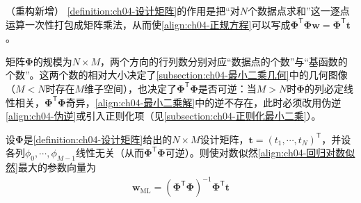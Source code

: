 \documentclass[../../main.tex]{subfiles}
\begin{document}
\begin{remark}（重构新增）
\cref{definition:ch04-设计矩阵}的作用是把“对$N$个数据点求和”这一逐点运算一次性打包成矩阵乘法，从而使\eqref{align:ch04-正规方程}可以写成$\boldsymbol{\Phi}^{\mathsf{T}}\boldsymbol{\Phi}\boldsymbol{w}=\boldsymbol{\Phi}^{\mathsf{T}}\boldsymbol{t}$。

矩阵$\boldsymbol{\Phi}$的规模为$N\times M$，两个方向的行列数分别对应“数据点的个数”与“基函数的个数”。这两个数的相对大小决定了\cref{subsection:ch04-最小二乘几何}中的几何图像（$M<N$时存在$M$维子空间），也决定了$\boldsymbol{\Phi}^{\mathsf{T}}\boldsymbol{\Phi}$是否可逆：当$M>N$时$\boldsymbol{\Phi}$的列必定线性相关，$\boldsymbol{\Phi}^{\mathsf{T}}\boldsymbol{\Phi}$奇异，\eqref{align:ch04-最小二乘解}中的逆不存在，此时必须改用伪逆\eqref{align:ch04-伪逆}或引入正则化项（见\cref{subsection:ch04-正则化最小二乘}）。
\end{remark}

\begin{proposition}[最大似然解]\label{proposition:ch04-最大似然解}
设$\boldsymbol{\Phi}$是\cref{definition:ch04-设计矩阵}给出的$N\times M$设计矩阵，$\boldsymbol{t}=(t_1,\cdots,t_N)^{\mathsf{T}}$，并设各列$\phi_0,\cdots,\phi_{M-1}$线性无关（从而$\boldsymbol{\Phi}^{\mathsf{T}}\boldsymbol{\Phi}$可逆）。则使对数似然\eqref{align:ch04-回归对数似然}最大的参数向量为
\begin{align}
  \boldsymbol{w}_{\mathrm{ML}}=(\boldsymbol{\Phi}^{\mathsf{T}}\boldsymbol{\Phi})^{-1}\boldsymbol{\Phi}^{\mathsf{T}}\boldsymbol{t}
  \label{align:ch04-最小二乘解}
\end{align}
\end{proposition}
\end{document}

